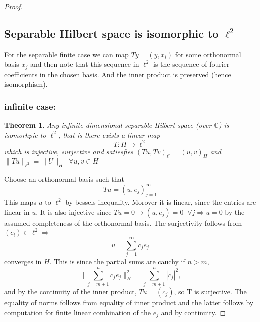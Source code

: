 \documentclass[titlepage]{article}
\newtheorem{thm}{Theorem}[section]
\begin{document}
\begin{proof}
\subsection{Separable Hilbert space is isomorphic to $\ell^2$}

For the separable finite case we can map $Ty = (y,x_i)$ for some orthonormal basis  $x_j$ and then note that this sequence in $\ell^2$ is the sequence of fourier coefficients in the chosen basis. And the inner product is preserved (hence isomorphism).

\subsubsection{infinite case:}

\begin{thm}
Any infinite-dimensional separable Hilbert space (over $\mathbb{C}$) is isomorhpic to $\ell^2$, that is there exists a linear map
\begin{equation}
T:H\rightarrow \ell^2
\end{equation}
which is injective, surjective and satiesfies $(Tu,Tv)_{\ell^2} = (u,v)_H$ and $\|Tu\|_{\ell^2} = \|U\|_H \;\; \forall u,v\in H$
\end{thm}
Choose an orthonormal basis such that 
\begin{equation}
Tu = (u,e_j)_{j = 1}^\infty
\end{equation}
This maps $u$ to $\ell^2$ by bessels inequality. Morover it is linear, since the entries are linear in $u$. It is also injective since $Tu =0 \rightarrow (u,e_j) = 0 \;\; \forall j \Rightarrow u = 0$ by the assumed completeness of the orthonormal basis. The surjectivity follows from $(c_i)\in \ell^2 \Longrightarrow$ 
\begin{equation}
u = \sum_{j=1}^\infty c_je_j
\end{equation}
converges in $H$. This is since the partial sums are cauchy if $n>m$,
\begin{equation}
\|\sum_{j = m+1}^n c_je_j\|_H^2 = \sum_{j = m+1}^n |c_j|^2,
\end{equation}
and by the continuity of the inner product, $Tu = (c_j)$, so T is surjective.
The equality of norms follows from equality of inner product and the latter follows by computation for finite linear combination of the $e_j$ and by continuity.


\end{proof}
\end{document}
